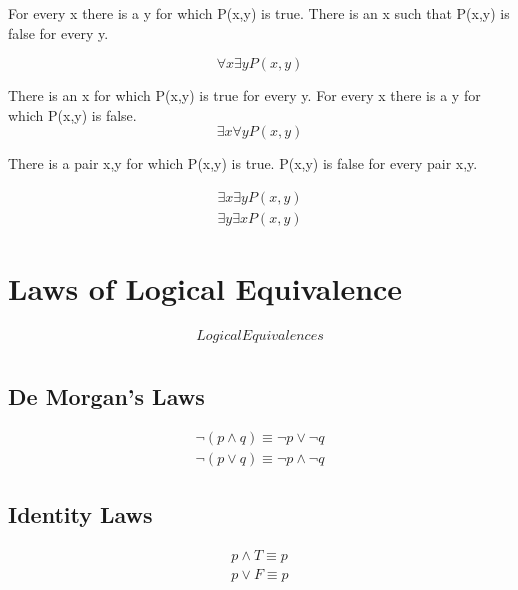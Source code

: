\documentclass[12pt]{article}
\begin{document}
%
For every x there is a y for which P(x,y) is true.
There is an x such that P(x,y) is false for every y.

\begin{equation}
\forall x \exists y P(x,y)
\end{equation}

%
There is an x for which P(x,y) is true for every y.
For every x there is a y for which P(x,y) is false.
\begin{equation}
\exists x \forall y P(x,y)
\end{equation}

%
There is a pair x,y for which P(x,y) is true.
P(x,y) is false for every pair x,y.

\begin{subequations}\label{quanD}
\begin{align}
\exists x \exists y P(x,y)\label{quanD_first}\\
\exists y \exists x P(x,y)\label{quanD_second}
\end{align}
\end{subequations}


\section{Laws of Logical Equivalence}
\setcounter{equation}{0}
\begin{align*}
Logical Equivalences\\
\end{align*}

\subsection{De Morgan's Laws}

\begin{subequations}\label{deMorgan}
\begin{align}
\neg (p \wedge q) \equiv \neg p \lor \neg q\label{de_first}\\
\neg (p \lor q) \equiv \neg p \wedge \neg q\label{de_second}
\end{align}
\end{subequations}

\subsection{Identity Laws}

\begin{subequations}\label{identity}
\begin{align}
p \wedge T \equiv p\label{id_first}\\
p \lor F \equiv p\label{id_second}
\end{align}
\end{subequations}
\end{document}
